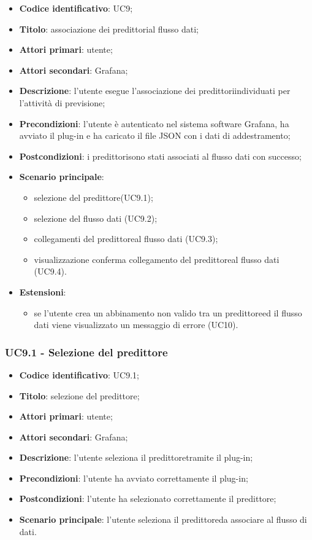 \begin{itemize}
	\item \textbf{Codice identificativo}: UC9;
	\item \textbf{Titolo}: associazione dei predittori\glosp al flusso dati;
	\item \textbf{Attori primari}: utente;
	\item \textbf{Attori secondari}: Grafana\glo;
	\item \textbf{Descrizione}: l'utente esegue l'associazione dei predittori\glosp individuati per l'attività di previsione;
	\item \textbf{Precondizioni}: l'utente è autenticato nel sistema software Grafana\glo, ha avviato il plug-in e ha caricato il file JSON con i dati di addestramento;
	\item \textbf{Postcondizioni}: i predittori\glosp sono stati associati al flusso dati con successo;
	\item \textbf{Scenario principale}: 
		\begin{itemize}
			\item selezione del predittore\glosp (UC9.1);
			\item selezione del flusso dati (UC9.2);
			\item collegamenti del predittore\glosp al flusso dati (UC9.3);
			\item visualizzazione conferma collegamento del predittore\glosp al flusso dati (UC9.4).
		\end{itemize}
	\item \textbf{Estensioni}:
		\begin{itemize}
			\item se l'utente crea un abbinamento non valido tra un predittore\glosp ed il flusso dati viene visualizzato un messaggio di errore (UC10).
		\end{itemize}
\end{itemize}

\subsubsection{UC9.1 - Selezione del predittore}
\begin{itemize}
	\item \textbf{Codice identificativo}: UC9.1;
	\item \textbf{Titolo}: selezione del predittore\glo;
	\item \textbf{Attori primari}: utente;
	\item \textbf{Attori secondari}: Grafana\glo;
	\item \textbf{Descrizione}: l'utente seleziona il predittore\glosp tramite il plug-in;
	\item \textbf{Precondizioni}: l'utente ha avviato correttamente il plug-in;
	\item \textbf{Postcondizioni}: l'utente ha selezionato correttamente il predittore\glo;
	\item \textbf{Scenario principale}: l'utente seleziona il predittore\glosp da associare al flusso di dati.
\end{itemize}

